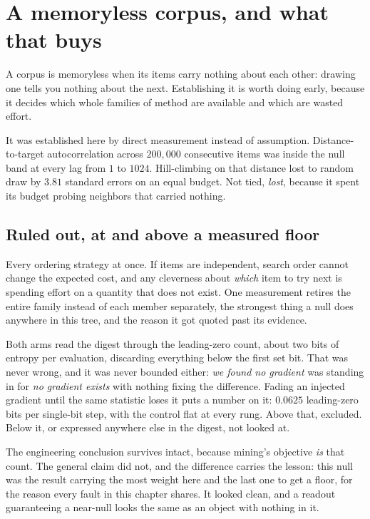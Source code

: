 \section{A memoryless corpus, and what that buys}

A corpus is memoryless when its items carry nothing about each other: drawing one tells you nothing about the next. Establishing it is worth doing early, because it decides which whole families of method are available and which are wasted effort.

It was established here by direct measurement instead of assumption. Distance-to-target autocorrelation across \(200{,}000\) consecutive items was inside the null band at every lag from \(1\) to \(1024\). Hill-climbing on that distance lost to random draw by \(3.81\) standard errors on an equal budget. Not tied, \emph{lost}, because it spent its budget probing neighbors that carried nothing.

\subsection{Ruled out, at and above a measured floor}

Every ordering strategy at once. If items are independent, search order cannot change the expected cost, and any cleverness about \emph{which} item to try next is spending effort on a quantity that does not exist. One measurement retires the entire family instead of each member separately, the strongest thing a null does anywhere in this tree, and the reason it got quoted past its evidence.

Both arms read the digest through the leading-zero count, about two bits of entropy per evaluation, discarding everything below the first set bit. That was never wrong, and it was never bounded either: \emph{we found no gradient} was standing in for \emph{no gradient exists} with nothing fixing the difference. Fading an injected gradient until the same statistic loses it puts a number on it: \(0.0625\) leading-zero bits per single-bit step, with the control flat at every rung. Above that, excluded. Below it, or expressed anywhere else in the digest, not looked at.

The engineering conclusion survives intact, because mining's objective \emph{is} that count. The general claim did not, and the difference carries the lesson: this null was the result carrying the most weight here and the last one to get a floor, for the reason every fault in this chapter shares. It looked clean, and a readout guaranteeing a near-null looks the same as an object with nothing in it.

